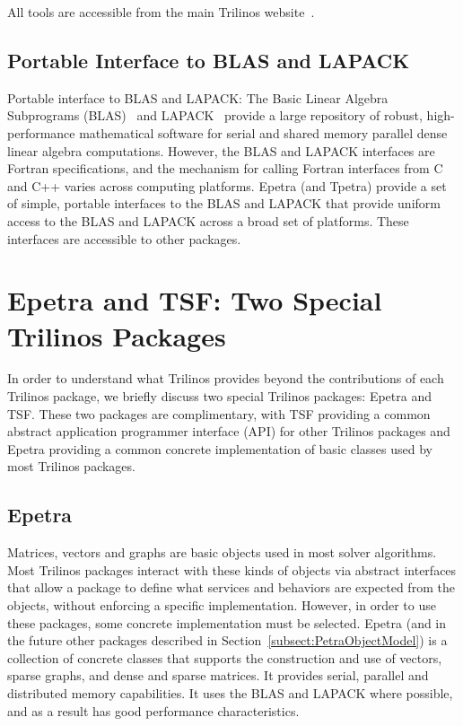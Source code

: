 \documentclass[12pt,relax]{TrilinosDevGuide}
\begin{document}
All 
tools are accessible from the main Trilinos website~\cite{Trilinos-home-page}.


	\subsection{Portable Interface to BLAS and LAPACK}

Portable interface to BLAS and LAPACK: The Basic Linear Algebra
Subprograms (BLAS)~\cite{BLAS1,BLAS2,BLAS3} and LAPACK~\cite{lapack}
provide a large repository of robust, high-performance mathematical
software for serial and shared memory parallel dense linear algebra
computations.  However, the BLAS and LAPACK interfaces are Fortran
specifications, and the mechanism for calling Fortran interfaces from
C and C++ varies across computing platforms.  Epetra (and Tpetra)
provide a set of simple, portable interfaces to the BLAS and LAPACK
that provide uniform access to the BLAS and LAPACK across a broad
set of platforms.  These interfaces are accessible to
other packages.

\section{Epetra and TSF: Two Special Trilinos Packages}
\label{Section:EpetraAndTSF}
In order to understand what Trilinos provides beyond the
contributions of each Trilinos package, we briefly discuss two special
Trilinos packages: Epetra and TSF.  These two packages are complimentary,
with TSF providing a common abstract application
programmer interface (API) for other Trilinos packages and Epetra
providing a common concrete implementation of basic classes used by most
Trilinos packages.

\subsection{Epetra}
Matrices, vectors and graphs are basic objects used in most solver
algorithms. Most Trilinos
packages interact with these kinds of objects via abstract interfaces that
allow a package to define what services and behaviors are expected from the objects,
without enforcing a specific implementation.  However, in order to use
these packages, some concrete
implementation must be selected.  Epetra (and in the future other packages described
in Section~\ref{subsect:PetraObjectModel}) is a collection of concrete
classes that supports the construction and use of vectors, sparse
graphs, and dense and sparse matrices.  It provides serial, parallel and
 distributed memory
capabilities.  It uses the BLAS and LAPACK where possible, and as a
result has good performance characteristics.
\end{document}
